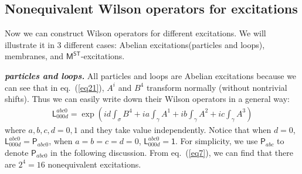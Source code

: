\documentclass[11pt,nofootinbib,preprint]{revtex4-1}
\begin{document}
\subsection{Nonequivalent Wilson operators for excitations}
Now we can construct Wilson operators for different excitations. We will illustrate it in $3$ different cases: Abelian excitations(particles and loops), membranes, and $\mathsf{M^{ST}}$-excitations.

\textbf{\textit{particles and loops.}}
All particles and loops are Abelian excitations because we can see that in eq.~(\ref{eq21}), $A^i$ and $B^4$ transform normally (without nontrivial shifts). Thus we can easily write down their Wilson operators in a general way:
\begin{align}
	\mathsf{L}_{000d}^{abc0}=\exp \left( id\int_{\sigma}{B^4}+ia\int_{\gamma}{A^1}+ib\int_{\gamma}{A^2}+ic\int_{\gamma}{A^3} \right)
	\label{eq7}
\end{align}
where $a,b,c,d=0,1$ and they take value independently. Notice that when $d=0$, $\mathsf{L}_{000d}^{abc0}=\mathsf{P}_{abc0}$, when $a=b=c=d=0$, $\mathsf{L}_{000d}^{abc0}=\mathsf{1}$. For simplicity, we use $\mathsf{P}_{abc}$ to denote $\mathsf{P}_{abc0}$ in the following discussion. From eq.~(\ref{eq7}), we can find that there are $2^4=16$ nonequivalent excitations. 
\end{document}
